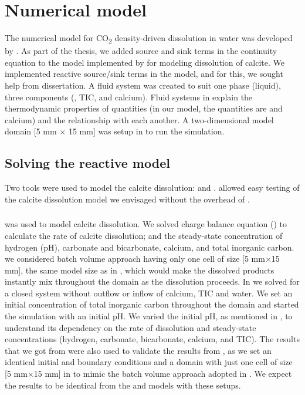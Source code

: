 \chapter{Numerical model}\label{chapter:numericalmodel}
\thispagestyle{empty}

The numerical model for CO\textsubscript{2} density-driven dissolution in water was developed by 
\citet{Class2020}. As part of the thesis, we added source and sink terms in the continuity equation 
to the  model implemented by \citet{Class2020} for modeling dissolution of calcite. We implemented 
reactive source/sink terms in the model, and for this, we sought help from \citet{hommel2016modeling} dissertation. 
A fluid system was created to suit one phase (liquid), three components (, TIC, and calcium). 
Fluid systems in \DuMuX explain the thermodynamic properties of quantities (in our model, the quantities are 
 and calcium) and the relationship with each another. A two-dimensional model domain [5 mm $\times$ 15 mm] 
was setup in \DuMuX to run the simulation.

\section{Solving the reactive model}
Two tools were used to model the calcite dissolution: \MATLAB and \DuMuX. \MATLAB allowed easy testing of the 
calcite dissolution model we envisaged without the overhead of \DuMuX.

\subsection{\MATLAB} \label{ssec:matlabIntro}
\MATLAB was used to model calcite dissolution. We solved charge balance equation () 
to calculate the rate of calcite dissolution; and the steady-state concentration of hydrogen (pH), carbonate and bicarbonate, 
calcium, and total inorganic carbon. we considered batch volume approach having only one cell of size [5 mm$\times$15 mm], 
the same model size as in \DuMuX , which would make the dissolved products instantly mix throughout the domain as 
the dissolution proceeds. In \MATLAB we solved for a closed system without outflow or inflow of calcium, TIC and water. 
We set an initial concentration of total inorganic carbon throughout the domain and started the simulation with an initial pH. 
We varied the initial pH, as mentioned in , to understand its dependency on the rate of dissolution and 
steady-state concentrations (hydrogen, carbonate, bicarbonate, calcium, and TIC). The results that we got from \MATLAB were 
also used to validate the results from \DuMuX, as we set an identical initial and boundary conditions and a domain with just 
one cell of size [5 mm$\times$15 mm] in \DuMuX to mimic the batch volume approach adopted in \MATLAB. We expect the results 
to be identical from the \MATLAB and \DuMuX models with these setups. \\

